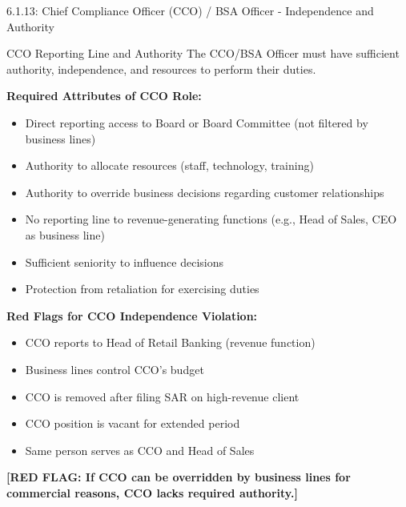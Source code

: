 \documentclass[11pt,a4paper]{beamer}
\newcommand{\redflag}[1]{\textcolor{red!80!black}{\textbf{[RED FLAG: #1]}}}
\begin{document}
\begin{frame}{6.1.13: Chief Compliance Officer (CCO) / BSA Officer - Independence and Authority}
	\begin{block}{CCO Reporting Line and Authority}
		The CCO/BSA Officer must have sufficient authority, independence, and resources to perform their duties.
	\end{block}
	\textbf{Required Attributes of CCO Role:}
	\begin{itemize}
		\item Direct reporting access to Board or Board Committee (not filtered by business lines)
		\item Authority to allocate resources (staff, technology, training)
		\item Authority to override business decisions regarding customer relationships
		\item No reporting line to revenue-generating functions (e.g., Head of Sales, CEO as business line)
		\item Sufficient seniority to influence decisions
		\item Protection from retaliation for exercising duties
	\end{itemize}
	\textbf{Red Flags for CCO Independence Violation:}
	\begin{itemize}
		\item CCO reports to Head of Retail Banking (revenue function)
		\item Business lines control CCO's budget
		\item CCO is removed after filing SAR on high-revenue client
		\item CCO position is vacant for extended period
		\item Same person serves as CCO and Head of Sales
	\end{itemize}
	\redflag{If CCO can be overridden by business lines for commercial reasons, CCO lacks required authority.}
\end{frame}
\end{document}
